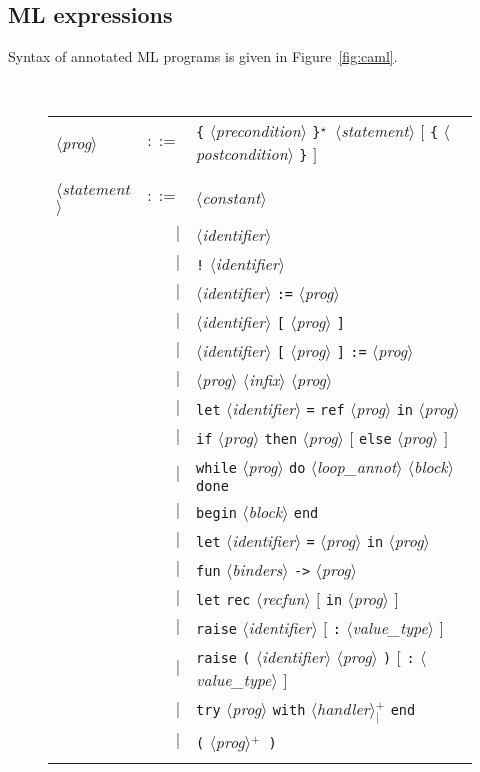 \documentclass[a4paper,12pt]{report}
\makeatletter
\newcommand{\te}[1]{\texttt{#1}}
\newcommand{\nt}[1]{$\langle$\textsl{#1}$\rangle$}
\newcommand{\indexnt}[1]{\index{#1@\textsl{#1}, grammar entry}}
\newcommand{\etoile}{$^{\star}$}
\newcommand{\plus}{$^+$}
\newcommand{\plussep}[1]{$^+_#1$}
\makeatother
\begin{document}
\subsection{ML expressions}
\label{syntax:mlexpr}

Syntax of annotated ML programs is given in Figure~\ref{fig:caml}.
\begin{figure}[htbp]
\begin{center}
\hrulefill\\
\begin{tabular}{lrl}
  \nt{prog}\indexnt{prog}
    & $::=$ & \te{\{} \nt{precondition} \te{\}}\etoile\
              \nt{statement} 
              $[$ \te{\{} \nt{postcondition} \te{\}} $]$ \\
  \\[0.1em]

  \nt{statement}\indexnt{statement}
    & $::=$ & \nt{constant} \\
      & $|$ & \nt{identifier} \\
      & $|$ & \te{!} \nt{identifier} \\
      & $|$ & \nt{identifier} \te{:=} \nt{prog} \\
      & $|$ & \nt{identifier} \te{[} \nt{prog} \te{]} \\
      & $|$ & \nt{identifier} \te{[} \nt{prog} \te{]} \te{:=} \nt{prog} \\
      & $|$ & \nt{prog} \nt{infix} \nt{prog} \\
      & $|$ & \te{let} \nt{identifier} \te{=} \te{ref} 
              \nt{prog} \te{in} \nt{prog} \\
      & $|$ & \te{if} \nt{prog} \te{then} \nt{prog}
              $[$ \te{else} \nt{prog} $]$ \\
      & $|$ & \te{while} \nt{prog} \te{do}
              \nt{loop\_annot} \nt{block} \te{done} \\
      & $|$ & \te{begin} \nt{block} \te{end} \\
      & $|$ & \te{let} \nt{identifier} \te{=} \nt{prog} 
              \te{in} \nt{prog} \\
      & $|$ & \te{fun} \nt{binders} \te{->} \nt{prog} \\
      & $|$ & \te{let} \te{rec} \nt{recfun} $[$ \te{in} \nt{prog} $]$ \\
      & $|$ & \te{raise} \nt{identifier} $[$ \te{:} \nt{value\_type} $]$ \\
      & $|$ & \te{raise} \te{(} \nt{identifier} \nt{prog} \te{)}
              $[$ \te{:} \nt{value\_type} $]$ \\
      & $|$ & \te{try} \nt{prog} \te{with} 
              \nt{handler}\plussep{\te{|}} \te{end} \\
      & $|$ & \te{(} \nt{prog}\plus\  \te{)} \\
  \\[0.1em]


\end{tabular}
\end{center}
\end{figure}
\end{document}
